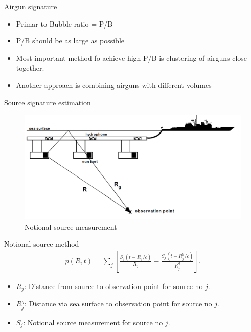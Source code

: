 \documentclass[xcolor=dvipsnames,notes]{beamer}
\begin{document}
\begin{frame}{Airgun signature}
\begin{itemize}
\item  Primar to Bubble ratio = P/B
\item  P/B should be as large as possible
\item  Most important method fo achieve high P/B is
       clustering of airguns close together.
\item  Another approach is combining airguns with different 
       volumes
\end{itemize}
\end{frame}
\begin{frame}{Source signature estimation}
\begin{figure}
  \includegraphics[width=\textwidth]{Fig/notional.png}
  \caption{Notional source measurement}
  \label{fig:notional}
\end{figure}
\end{frame}
\begin{frame}{Notional source method}
\begin{eqnarray}
    p(R,t) = \sum_j \left[\frac{S_j(t-R_j/c)}{R_j} 
                   - \frac{S_j(t-R^g_j/c)}{R^g_j}\right].
\end{eqnarray}
\begin{itemize}
\item $R_j$: Distance from source to observation point for source no $j$.
\item $R^g_j$: Distance via sea surface to observation point for source no $j$.
\item $S_j$: Notional source measurement for source no $j$.
\end{itemize}
\end{frame}
\end{document}
